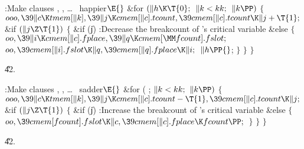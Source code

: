 \B{}:Make clauses , , \dots%
\ happier\X${}\E{}$\6
\&{for} ${}(\|h\K\T{0};{}$ ${}\|k<\\{kk};{}$ ${}\|k\PP){}$\5
${}\{{}$\1\6
${}\\{ooo},\39\|c\K\\{tmem}[\|k],\39\|j\K\\{cmem}[\|c].\\{tcount},\39\\{cmem}[%
\|c].\\{tcount}\K\|j+\T{1};{}$\6
\&{if} ${}(\|j\Z\T{1}){}$\5
${}\{{}$\1\6
\&{if} (\|j)\1\5
:Decrease the breakcount of 's critical variable\X\2\6
\&{else}\5
${}\{{}$\1\6
${}\\{oo},\39\|i\K\\{cmem}[\|c].\\{fplace},\39\|q\K\\{cmem}[\MM\\{fcount}].%
\\{fslot};{}$\6
${}\\{oo},\39\\{cmem}[\|i].\\{fslot}\K\|q,\39\\{cmem}[\|q].\\{fplace}\K\|i;{}$\6
${}\|h\PP{}$;\6
\4${}\}{}$\2\6
\4${}\}{}$\2\6
\4${}\}{}$\2\par
\U42.\fi

\B{}:Make clauses , , \dots%
\ sadder\X${}\E{}$\6
\&{for} ( ; ${}\|k<\\{kk};{}$ ${}\|k\PP){}$\5
${}\{{}$\1\6
${}\\{ooo},\39\|c\K\\{tmem}[\|k],\39\|j\K\\{cmem}[\|c].\\{tcount}-\T{1},\39%
\\{cmem}[\|c].\\{tcount}\K\|j;{}$\6
\&{if} ${}(\|j\Z\T{1}){}$\5
${}\{{}$\1\6
\&{if} (\|j)\1\5
:Increase the breakcount of 's critical variable\X\2\6
\&{else}\5
${}\{{}$\1\6
${}\\{oo},\39\\{cmem}[\\{fcount}].\\{fslot}\K\|c,\39\\{cmem}[\|c].\\{fplace}\K%
\\{fcount}\PP;{}$\6
\4${}\}{}$\2\6
\4${}\}{}$\2\6
\4${}\}{}$\2\par
\U42.\fi

